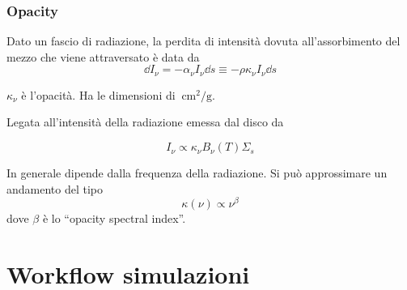 \documentclass[DIN, pagenumber=false, fontsize=11pt, parskip=half]{scrartcl}
\begin{document}
\subsubsection{Opacity}
\label{opa}

Dato un fascio di radiazione, la perdita di intensità dovuta all'assorbimento del mezzo che viene attraversato è data da
\begin{equation}
 \dd I_\nu = - \alpha_\nu I_\nu \dd s \equiv - \rho \kappa_\nu I_\nu \dd s
\end{equation}


$\kappa_\nu$ è l'opacità. Ha le dimensioni di $\SI{}{\cm\squared\per\g}$.

Legata all'intensità della radiazione emessa dal disco da 

\begin{equation}
 I_\nu \propto \kappa_\nu B_\nu (T ) \Sigma_s
\end{equation}

In generale dipende dalla frequenza della radiazione. Si può approssimare un andamento del tipo 
\begin{equation}
 \kappa(\nu) \propto \nu^\beta
\end{equation}
dove $\beta$ è lo ``opacity spectral index''.

\section{Workflow simulazioni}
\end{document}

